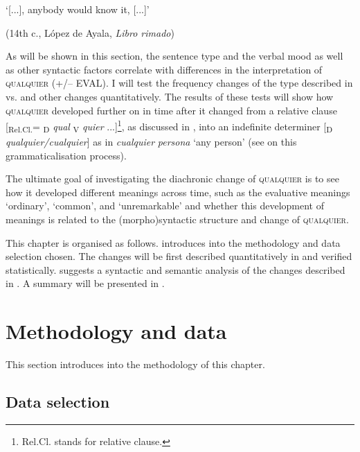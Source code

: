 ‘[...], anybody would know it, [...]’

    (14{th} c., López de Ayala, \textit{Libro rimado})
\z
\z

As will be shown in this section, the sentence type and the verbal mood as well as other syntactic factors correlate with differences in the interpretation of \textsc{qualquier} (+/– EVAL). I will test the frequency changes of the type described in  vs.  and other changes quantitatively. The results of these tests will show how \textsc{qualquier} developed further on in time after it changed from a relative clause [\textsubscript{Rel.Cl.}= \textsubscript{D} \textit{qual} \textsubscript{V} \textit{quier} ...]\footnote{Rel.Cl. stands for relative clause.}, as discussed in , into an indefinite determiner [\textsubscript{D} \textit{qualquier/cualquier}] as in \textit{cualquier} \textit{persona} ‘any person’ (see  on this grammaticalisation process).

The ultimate goal of investigating the diachronic change of \textsc{qualquier} is to see how it developed different meanings across time, such as the evaluative meanings ‘ordinary’, ‘common’, and ‘unremarkable’ and whether this development of meanings is related to the (morpho)syntactic structure and change of \textsc{qualquier.}

This chapter is organised as follows.  introduces into the methodology and data selection chosen. The changes will be first described quantitatively in  and verified statistically.  suggests a syntactic and semantic analysis of the changes described in . A summary will be presented in .

\section{{Methodology} {and} {data}} \label{sec:5.1}

This section introduces into the methodology of this chapter.

\subsection{{Data} {selection}} \label{sec:5.1.1}

